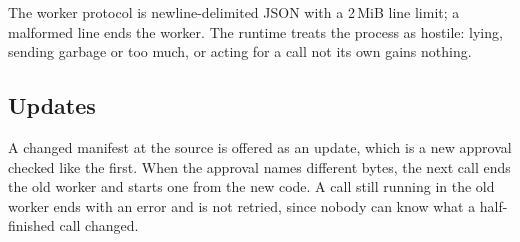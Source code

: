 The worker protocol is newline-delimited JSON with a 2\,MiB line limit;
a malformed line ends the worker. The runtime treats the process as
hostile: lying, sending garbage or too much, or acting for a call not
its own gains nothing.

\subsection{Updates}

A changed manifest at the source is offered as an update, which is a
new approval checked like the first. When the approval names different
bytes, the next call ends the old worker and starts one from the new
code. A call still running in the old worker ends with an error and is
not retried, since nobody can know what a half-finished call changed.
